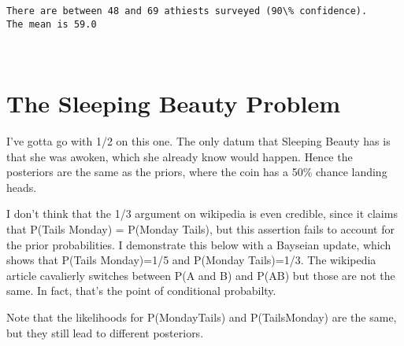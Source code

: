 \documentclass[11pt]{article}
\begin{document}
    \begin{Verbatim}[commandchars=\\\{\}]
There are between 48 and 69 athiests surveyed (90\% confidence).
The mean is 59.0

    \end{Verbatim}

    \begin{center}
    \end{center}
    { \hspace*{\fill} \\}
    
    \section{The Sleeping Beauty Problem}\label{the-sleeping-beauty-problem}

I've gotta go with 1/2 on this one. The only datum that Sleeping Beauty
has is that she was awoken, which she already know would happen. Hence
the posteriors are the same as the priors, where the coin has a 50\%
chance landing heads.

I don't think that the 1/3 argument on wikipedia is even credible, since
it claims that P(Tails \textbar{} Monday) = P(Monday \textbar{} Tails),
but this assertion fails to account for the prior probabilities. I
demonstrate this below with a Bayseian update, which shows that P(Tails
\textbar{} Monday)=1/5 and P(Monday \textbar{} Tails)=1/3. The wikipedia
article cavalierly switches between P(A and B) and P(A\textbar{}B) but
those are not the same. In fact, that's the point of conditional
probabilty.

Note that the likelihoods for P(Monday\textbar{}Tails) and
P(Tails\textbar{}Monday) are the same, but they still lead to different
posteriors.
\end{document}
